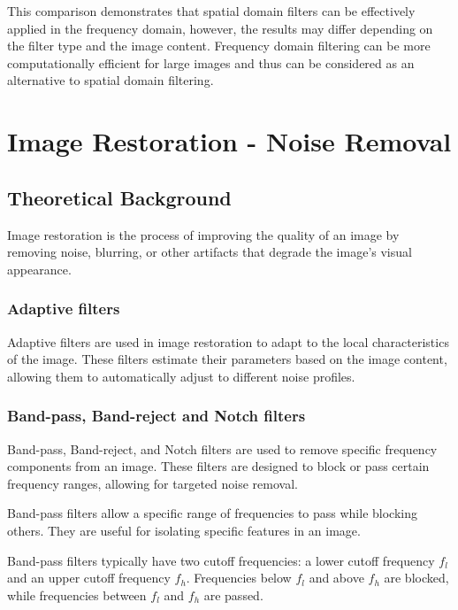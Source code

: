 \documentclass[a4paper,12pt]{article}
\begin{document}
This comparison demonstrates that spatial domain filters can be effectively applied in the frequency domain, however, the results may differ depending on the filter type and the image content. Frequency domain filtering can be more computationally efficient for large images and thus can be considered as an alternative to spatial domain filtering.

\newpage

\section{Image Restoration - Noise Removal}

\subsection{Theoretical Background}

Image restoration is the process of improving the quality of an image by removing noise, blurring, or other artifacts that degrade the image's visual appearance.

\subsubsection{Adaptive filters}

Adaptive filters are used in image restoration to adapt to the local characteristics of the image. These filters estimate their parameters based on the image content, allowing them to automatically adjust to different noise profiles.

\subsubsection{Band-pass, Band-reject and Notch filters}

Band-pass, Band-reject, and Notch filters are used to remove specific frequency components from an image. These filters are designed to block or pass certain frequency ranges, allowing for targeted noise removal.

Band-pass filters allow a specific range of frequencies to pass while blocking others. They are useful for isolating specific features in an image.

Band-pass filters typically have two cutoff frequencies: a lower cutoff frequency \( f_l \) and an upper cutoff frequency \( f_h \). Frequencies below \( f_l \) and above \( f_h \) are blocked, while frequencies between \( f_l \) and \( f_h \) are passed.
\end{document}
